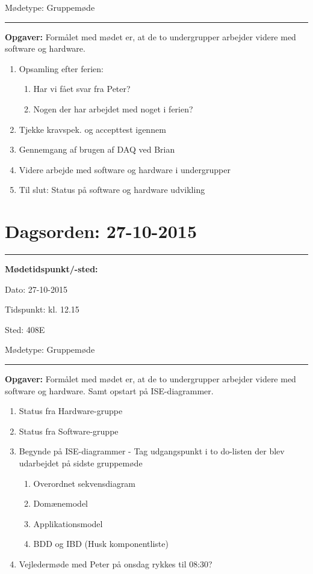 Mødetype: \tabto{7em} Gruppemøde \newline


\hrule
\textbf{Opgaver:} \newline
Formålet med mødet er, at de to undergrupper arbejder videre med software og hardware.
\begin{enumerate}
\item Opsamling efter ferien:
\begin{enumerate}
\item Har vi fået svar fra Peter?
\item Nogen der har arbejdet med noget i ferien?
\end{enumerate}

\item Tjekke kravspek. og accepttest igennem

\item Gennemgang af brugen af DAQ ved Brian

\item Videre arbejde med software og hardware i undergrupper

\item Til slut: Status på software og hardware udvikling
\end{enumerate}


\newpage
\section{Dagsorden: 27-10-2015}
\hrule



\textbf{Mødetidspunkt/-sted:} 

Dato: \tabto{7em} 27-10-2015

Tidspunkt: \tabto{7em} kl. 12.15

Sted: \tabto{7em} 408E

Mødetype: \tabto{7em} Gruppemøde \newline


\hrule
\textbf{Opgaver:} \newline
Formålet med mødet er, at de to undergrupper arbejder videre med software og hardware. Samt opstart på ISE-diagrammer.
\begin{enumerate}
\item Status fra Hardware-gruppe

\item Status fra Software-gruppe

\item Begynde på ISE-diagrammer - Tag udgangspunkt i to do-listen der blev udarbejdet på sidste gruppemøde
\begin{enumerate}
\item Overordnet sekvensdiagram
\item Domænemodel
\item Applikationsmodel
\item BDD og IBD (Husk komponentliste)
\end{enumerate}

\item Vejledermøde med Peter på onsdag rykkes til 08:30?
\end{enumerate}


